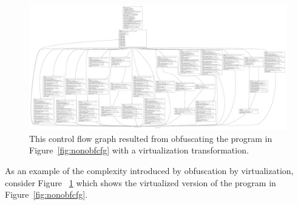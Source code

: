 \begin{figure}[t]
\includegraphics[width=.5\textwidth]{simple_virtualizedO0_cfg-1.jpg}
\caption{This control flow graph resulted from obfuscating the program in Figure~\protect\ref{fig:nonobfcfg} with a virtualization transformation.}
\label{fig:virtcfg}
\end{figure}

As an example of the complexity introduced by obfuscation by virtualization, consider Figure ~\ref{fig:virtcfg} which shows the virtualized version of the program in Figure~\ref{fig:nonobfcfg}.
 



